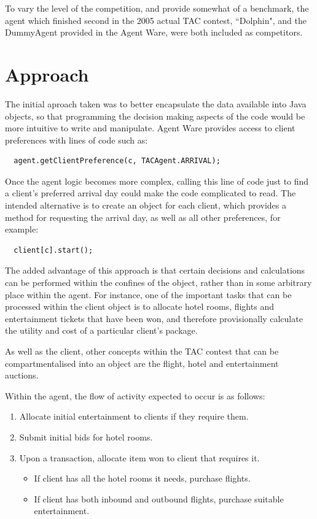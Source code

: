 \documentclass{acm_proc_article-sp}
\begin{document}
 To vary the level of the competition, and provide somewhat of a benchmark, the agent which finished second in the 2005 actual TAC contest, ``Dolphin", and the DummyAgent provided in the Agent Ware, were both included as competitors.
 
\section{Approach}
 \label{approach}

 The initial aproach taken was to better encapsulate the data available into Java objects, so that programming the decision making aspects of the code would be more intuitive to write and manipulate.  Agent Ware provides access to client preferences with lines of code such as:
 \begin{verbatim}
  agent.getClientPreference(c, TACAgent.ARRIVAL);
 \end{verbatim}
 Once the agent logic becomes more complex, calling this line of code just to find a client's preferred arrival day could make the code complicated to read.  The intended alternative is to create an object for each client, which provides a method for requesting the arrival day, as well as all other preferences, for example:
 \begin{verbatim}
  client[c].start();
 \end{verbatim}
 The added advantage of this approach is that certain decisions and calculations can be performed within the confines of the object, rather than in some arbitrary place within the agent.  For instance, one of the important tasks that can be processed within the client object is to allocate hotel rooms, flights and entertainment tickets that have been won, and therefore provisionally calculate the utility and cost of a particular client's package.
 
 As well as the client, other concepts within the TAC contest that can be compartmentalised into an object are the flight, hotel and entertainment auctions.
 
 Within the agent, the flow of activity expected to occur is as follows:
 \begin{enumerate}
  \item Allocate initial entertainment to clients if they require them.
  \item Submit initial bids for hotel rooms.
  \item Upon a transaction, allocate item won to client that requires it.
   \begin{itemize}
    \item If client has all the hotel rooms it needs, purchase flights.
    \item If client has both inbound and outbound flights, purchase suitable entertainment.
   \end{itemize}
 \end{enumerate}
\end{document}
